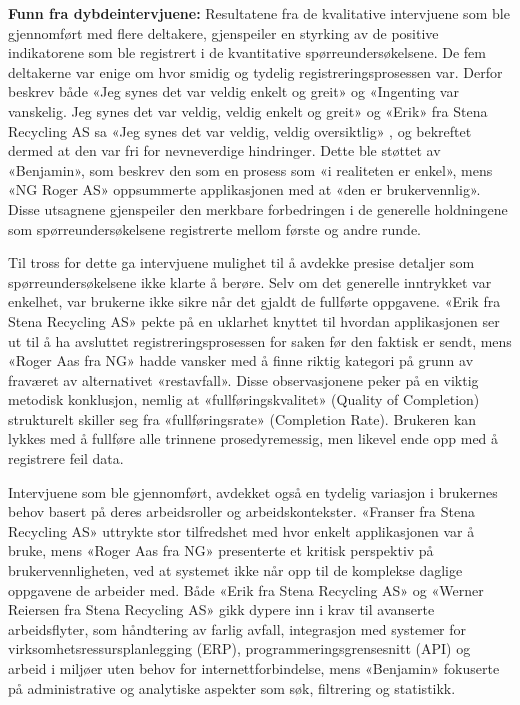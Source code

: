 \newline 
\textbf{Funn fra dybdeintervjuene: }
Resultatene fra de kvalitative intervjuene som ble gjennomført med flere deltakere, gjenspeiler en styrking av de positive indikatorene som ble registrert i de kvantitative spørreundersøkelsene. De fem deltakerne var enige om hvor smidig og tydelig registreringsprosessen var. Derfor beskrev både  «Jeg synes det var veldig enkelt og greit» og «Ingenting var vanskelig. Jeg synes det var veldig, veldig enkelt og greit» og «Erik» fra Stena Recycling AS sa «Jeg synes det var veldig, veldig oversiktlig» , og bekreftet dermed at den var fri for nevneverdige hindringer. Dette ble støttet av «Benjamin», som beskrev den som en prosess som «i realiteten er enkel», mens «NG Roger AS» oppsummerte applikasjonen med at «den er brukervennlig». Disse utsagnene gjenspeiler den merkbare forbedringen i de generelle holdningene som spørreundersøkelsene registrerte mellom første og andre runde.

Til tross for dette ga intervjuene mulighet til å avdekke presise detaljer som spørreundersøkelsene ikke klarte å berøre. Selv om det generelle inntrykket var enkelhet, var brukerne ikke sikre når det gjaldt de fullførte oppgavene. «Erik fra Stena Recycling AS» pekte på en uklarhet knyttet til hvordan applikasjonen ser ut til å ha avsluttet registreringsprosessen for saken før den faktisk er sendt, mens «Roger Aas fra NG» hadde vansker med å finne riktig kategori på grunn av fraværet av alternativet «restavfall». Disse observasjonene peker på en viktig metodisk konklusjon, nemlig at «fullføringskvalitet» (Quality of Completion) strukturelt skiller seg fra «fullføringsrate» (Completion Rate). Brukeren kan lykkes med å fullføre alle trinnene prosedyremessig, men likevel ende opp med å registrere feil data.

Intervjuene som ble gjennomført, avdekket også en tydelig variasjon i brukernes behov basert på deres arbeidsroller og arbeidskontekster. «Franser fra Stena Recycling AS» uttrykte stor tilfredshet med hvor enkelt applikasjonen var å bruke, mens «Roger Aas fra NG» presenterte et kritisk perspektiv på brukervennligheten, ved at systemet ikke når opp til de komplekse daglige oppgavene de arbeider med. Både «Erik fra Stena Recycling AS» og «Werner Reiersen fra Stena Recycling AS» gikk dypere inn i krav til avanserte arbeidsflyter, som håndtering av farlig avfall, integrasjon med systemer for virksomhetsressursplanlegging (ERP), programmeringsgrensesnitt (API) og arbeid i miljøer uten behov for internettforbindelse, mens «Benjamin» fokuserte på administrative og analytiske aspekter som søk, filtrering og statistikk.

